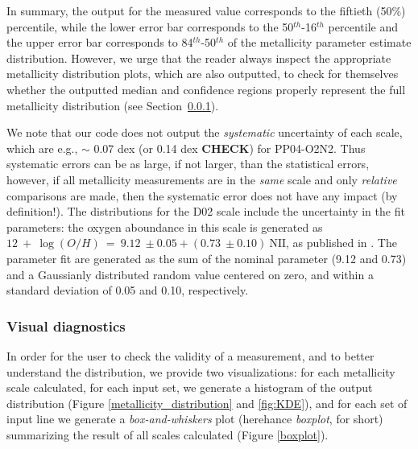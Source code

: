 \documentclass{emulateapj}
\newcommand{\oxab}{\ensuremath{12~+~\log(O/H)}}
\begin{document}
In summary, the output for the measured value corresponds to the fiftieth (50\%) percentile, while the lower error bar corresponds to the 50$^{th}$-16$^{th}$ percentile and the upper error bar corresponds to 84$^{th}$-50$^{th}$ of the metallicity parameter estimate distribution. However, we urge that the reader always inspect the appropriate metallicity distribution plots, which are also outputted, to check for themselves whether the outputted median and confidence regions properly represent the full metallicity distribution (see Section~\ref{visz}).

We note that our code  does not output the \emph{systematic} uncertainty of each scale, which are e.g., $\sim$ 0.07 dex (or 0.14 dex \textbf{CHECK}) for PP04-O2N2.  Thus systematic errors can be as large, if not larger, than the statistical errors, however, if all metallicity measurements are in the \emph{same} scale and only \emph{relative} comparisons are made, then the systematic error does not have any impact (by definition!). The distributions for the D02 scale include the uncertainty in the fit parameters: the oxygen aboundance in this scale is generated as \oxab~=~$9.12~\pm 0.05 + (0.73~\pm 0.10)~\mathrm{NII}$, as published in  \citet{denicolo02}. The parameter fit are generated as the sum of the nominal parameter (9.12 and 0.73) and a Gaussianly distributed random value centered on zero, and within a standard deviation of 0.05 and 0.10, respectively.




\subsubsection{Visual diagnostics}\label{visz}
In order for the user to check the validity of a measurement, and to better understand the distribution, we provide two visualizations: for each metallicity scale calculated, for each input set, we generate a histogram of the output distribution (Figure \ref{metallicity_distribution} and \ref{fig:KDE}), and for each set of input line we generate a \emph{box-and-whiskers} plot (herehance \emph{boxplot}, for short) summarizing the result of all scales calculated (Figure \ref{boxplot}). 
\end{document}
